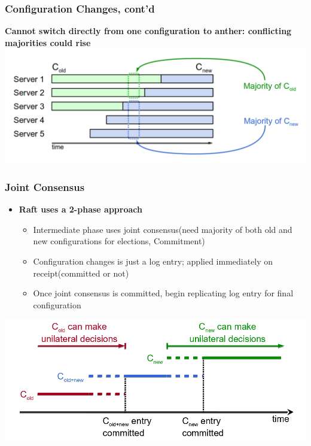 \begin{frame}
    \frametitle{Configuration Changes, cont'd}
    \textbf{Cannot switch directly from one configuration to anther: \alert{conflicting majorities} could rise}
    \includegraphics[scale=0.3]{./figures/raft-configuration-changes.png}
\end{frame}

\begin{frame}
    \frametitle{Joint Consensus}
    \begin{itemize}
        \item \textbf{Raft uses a 2-phase approach}
            \begin{itemize}
                \item Intermediate phase uses \alert{joint consensus}(need majority of both old and new configurations for elections, Commitment)
                \item Configuration changes is just a log entry; applied immediately on receipt(committed or not)
                \item Once joint consensus is committed, begin replicating log entry for final configuration
            \end{itemize}
    \end{itemize}
    \includegraphics[scale=0.3]{./figures/raft-joint-consensus.png}
\end{frame}

